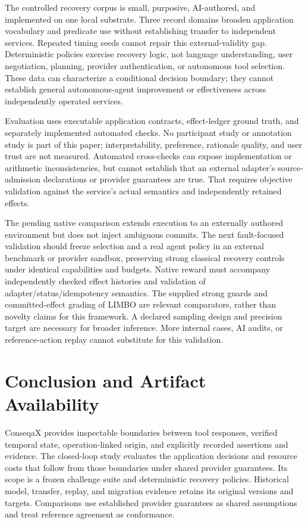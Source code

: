 \documentclass[conference]{IEEEtran}
\begin{document}
The controlled recovery corpus is small, purposive, AI-authored, and implemented on one local substrate. Three record domains broaden application vocabulary and predicate use without establishing transfer to independent services. Repeated timing seeds cannot repair this external-validity gap. Deterministic policies exercise recovery logic, not language understanding, user negotiation, planning, provider authentication, or autonomous tool selection. These data can characterize a conditional decision boundary; they cannot establish general autonomous-agent improvement or effectiveness across independently operated services.

Evaluation uses executable application contracts, effect-ledger ground truth, and separately implemented automated checks. No participant study or annotation study is part of this paper; interpretability, preference, rationale quality, and user trust are not measured. Automated cross-checks can expose implementation or arithmetic inconsistencies, but cannot establish that an external adapter's source-admission declarations or provider guarantees are true. That requires objective validation against the service's actual semantics and independently retained effects.

The pending native comparison extends execution to an externally authored environment but does not inject ambiguous commits. The next fault-focused validation should freeze selection and a real agent policy in an external benchmark or provider sandbox, preserving strong classical recovery controls under identical capabilities and budgets. Native reward must accompany independently checked effect histories and validation of adapter/status/idempotency semantics. The supplied strong guards and committed-effect grading of LIMBO \cite{limbo} are relevant comparators, rather than novelty claims for this framework. A declared sampling design and precision target are necessary for broader inference. More internal cases, AI audits, or reference-action replay cannot substitute for this validation.

\section{Conclusion and Artifact Availability}

ConseqaX provides inspectable boundaries between tool responses, verified temporal state, operation-linked origin, and explicitly recorded assertions and evidence. The closed-loop study evaluates the application decisions and resource costs that follow from those boundaries under shared provider guarantees. Its scope is a frozen challenge suite and deterministic recovery policies. Historical model, transfer, replay, and migration evidence retains its original versions and targets. Comparisons use established provider guarantees as shared assumptions and treat reference agreement as conformance.
\end{document}
